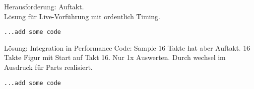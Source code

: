 \documentclass[
10pt, %
a4paper, %
oneside, %
headinclude,footinclude, %
BCOR5mm, %
]{scrartcl}
\begin{document}
\noindent Herausforderung: Auftakt.\\
Lösung für Live-Vorführung mit ordentlich Timing.
\begin{lstlisting}
...add some code
\end{lstlisting}
Lösung: Integration in Performance Code: Sample 16 Takte hat aber Auftakt. 16 Takte Figur mit Start auf Takt 16. Nur 1x Auswerten. Durch wechsel im Ausdruck für Parts realisiert.
\begin{lstlisting}
...add some code
\end{lstlisting}

\pagebreak







\renewcommand{\refname}{\spacedlowsmallcaps{Literatur/Quellen}} %




\end{document}

